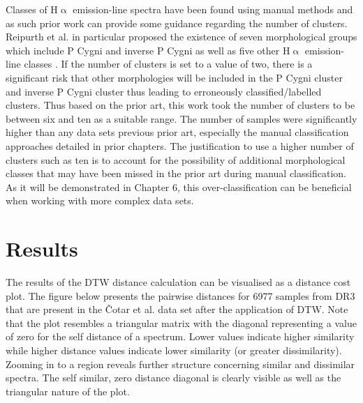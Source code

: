 Classes of H$\upalpha$ emission-line spectra have been found using manual methods and as such prior work can provide some guidance regarding the number of clusters. Reipurth et al. in particular proposed the existence of seven morphological groups which include P Cygni and inverse P Cygni as well as five other H$\upalpha$ emission-line classes \cite{reipurth1996hupalpha}. If the number of clusters is set to a value of two, there is a significant risk that other morphologies will be included in the P Cygni cluster and inverse P Cygni cluster thus leading to erroneously classified/labelled clusters. Thus based on the prior art, this work took the number of clusters to be between six and ten as a suitable range. The number of samples were significantly higher than any data sets previous prior art, especially the manual classification approaches detailed in prior chapters. The justification to use a higher number of clusters such as ten is to account for the possibility of additional morphological classes that may have been missed in the prior art during manual classification. As it will be demonstrated in Chapter 6, this over-classification can be beneficial when working with more complex data sets.

\section{Results}

The results of the DTW distance calculation can be visualised as a distance cost plot. The figure below presents the pairwise distances for 6977 samples from DR3 that are present in the Čotar et al. data set after the application of DTW. Note that the plot resembles a triangular matrix with the diagonal representing a value of zero for the self distance of a spectrum. Lower values indicate higher similarity while higher distance values indicate lower similarity (or greater dissimilarity). Zooming in to a region reveals further structure concerning similar and dissimilar spectra. The self similar, zero distance diagonal is clearly visible as well as the triangular nature of the plot.

